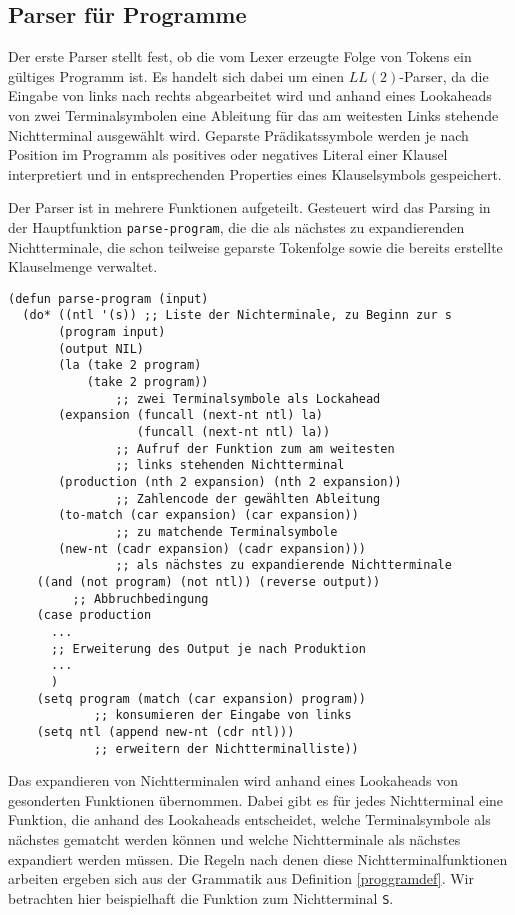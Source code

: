 \subsection{Parser für Programme}\label{progparser}
Der erste Parser stellt fest, ob die vom Lexer erzeugte Folge von Tokens ein gültiges Programm ist. Es handelt sich dabei um einen $LL(2)$-Parser, da die Eingabe von links nach rechts abgearbeitet wird und anhand eines Lookaheads von zwei Terminalsymbolen eine Ableitung für das am weitesten Links stehende Nichtterminal ausgewählt wird. Geparste Prädikatssymbole werden je nach Position im Programm als positives oder negatives Literal einer Klausel interpretiert und in entsprechenden Properties eines Klauselsymbols gespeichert.

Der Parser ist in mehrere Funktionen aufgeteilt. Gesteuert wird das Parsing in der  Hauptfunktion {\tt parse-program}, die die als nächstes zu expandierenden Nichtterminale, die schon teilweise geparste Tokenfolge sowie die bereits erstellte Klauselmenge verwaltet.

\begin{verbatim}
(defun parse-program (input)
  (do* ((ntl '(s)) ;; Liste der Nichterminale, zu Beginn zur s
       (program input)
       (output NIL)
       (la (take 2 program) 
           (take 2 program)) 
               ;; zwei Terminalsymbole als Lockahead
       (expansion (funcall (next-nt ntl) la) 
                  (funcall (next-nt ntl) la))
               ;; Aufruf der Funktion zum am weitesten 
               ;; links stehenden Nichtterminal
       (production (nth 2 expansion) (nth 2 expansion))
               ;; Zahlencode der gewählten Ableitung
       (to-match (car expansion) (car expansion))
               ;; zu matchende Terminalsymbole
       (new-nt (cadr expansion) (cadr expansion)))
               ;; als nächstes zu expandierende Nichtterminale
    ((and (not program) (not ntl)) (reverse output))
         ;; Abbruchbedingung
    (case production
      ...
      ;; Erweiterung des Output je nach Produktion
      ...
      )
    (setq program (match (car expansion) program))  
            ;; konsumieren der Eingabe von links
    (setq ntl (append new-nt (cdr ntl)))
            ;; erweitern der Nichtterminalliste))
\end{verbatim}

Das expandieren von Nichtterminalen wird anhand eines Lookaheads von gesonderten Funktionen übernommen. Dabei gibt es für jedes Nichtterminal eine Funktion, die anhand des Lookaheads entscheidet, welche Terminalsymbole als nächstes gematcht werden können und welche Nichtterminale als nächstes expandiert werden müssen. Die Regeln nach denen diese Nichtterminalfunktionen arbeiten ergeben sich aus der Grammatik aus Definition \ref{proggramdef}. Wir betrachten hier beispielhaft die Funktion zum Nichtterminal {\tt S}.
\newpage


